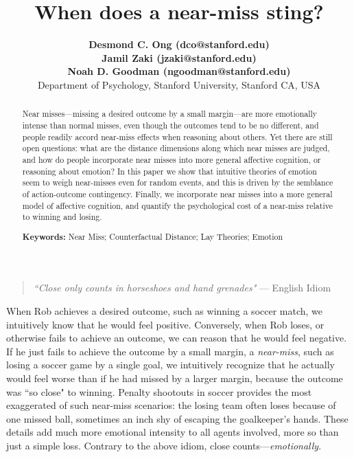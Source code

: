 \documentclass[10pt,letterpaper]{article}
\title{ When does a near-miss sting? }
\author{{\large \bf Desmond C. Ong (dco@stanford.edu)} \\
{\large \bf Jamil Zaki (jzaki@stanford.edu)} \\
{\large \bf Noah D. Goodman (ngoodman@stanford.edu)} \\
  Department of Psychology, Stanford University, Stanford CA, USA 
}
\begin{document}
\maketitle

\begin{abstract}
Near misses---missing a desired outcome by a small margin---are more emotionally intense than normal misses, even though the outcomes tend to be no different, and people readily accord near-miss effects when reasoning about others. Yet there are still open questions: what are the distance dimensions along which near misses are judged, and how do people incorporate near misses into more general affective cognition, or reasoning about emotion? In this paper we show that intuitive theories of emotion seem to weigh near-misses even for random events, and this is driven by the semblance of action-outcome contingency. Finally, we incorporate near misses into a more general model of affective cognition, and quantify the psychological cost of a near-miss relative to winning and losing.

\textbf{Keywords:} 
Near Miss; Counterfactual Distance; Lay Theories; Emotion
\end{abstract}


\begin{quote}
\textit{``Close only counts in horseshoes and hand grenades"} 
--- English Idiom
\end{quote}


	When Rob achieves a desired outcome, such as winning a soccer match, we intuitively know that he would feel positive. Conversely, when Rob loses, or otherwise fails to achieve an outcome, we can reason that he would feel negative. If he just fails to achieve the outcome by a small margin, a \textit{near-miss}, such as losing a soccer game by a single goal, we intuitively recognize that he actually would feel worse than if he had missed by a larger margin, because the outcome was ``so close" to winning. Penalty shootouts in soccer provides the most exaggerated of such near-miss scenarios: the losing team often loses because of one missed ball, sometimes an inch shy of escaping the goalkeeper's hands. These details add much more emotional intensity to all agents involved, more so than just a simple loss. Contrary to the above idiom, close counts---\textit{emotionally}.

%
	
\end{document}
